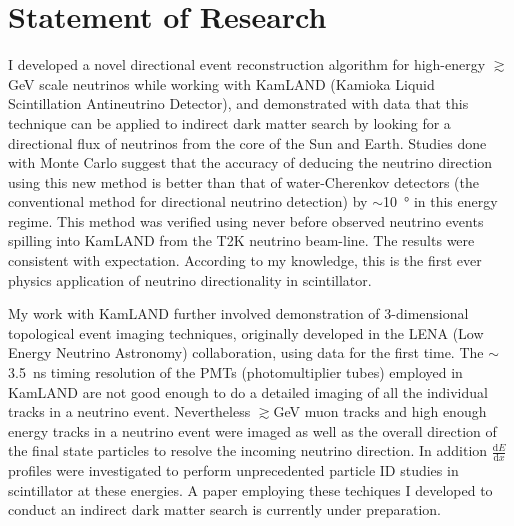 \documentclass[10pt]{article} %
\begin{document}

\clearpage
\section{Statement of Research}

I developed a novel directional event reconstruction algorithm for high-energy
$\gtrsim$\si{\giga\electronvolt} scale neutrinos while working with KamLAND
(Kamioka Liquid Scintillation Antineutrino Detector), and demonstrated with
data that this technique can be applied to indirect dark matter search by
looking for a directional flux of neutrinos from the core of the Sun and Earth.
Studies done with Monte Carlo suggest that the accuracy of deducing the
neutrino direction using this new method is better than that of water-Cherenkov
detectors (the conventional method for directional neutrino detection) by
$\sim$\SI{10}{\degree} in this energy regime. This method was verified using
never before observed neutrino events spilling into KamLAND from the T2K
neutrino beam-line. The results were consistent with expectation. According to
my knowledge, this is the first ever physics application of neutrino
directionality in scintillator.

My work with KamLAND further involved demonstration of 3-dimensional
topological event imaging techniques, originally developed in the LENA (Low
Energy Neutrino Astronomy) collaboration, using data for the first time. The
$\sim$\SI{3.5}{\nano\second} timing resolution of the PMTs (photomultiplier
tubes) employed in KamLAND are not good enough to do a detailed imaging of all
the individual tracks in a neutrino event. Nevertheless
$\gtrsim$\si{\giga\electronvolt} muon tracks and high enough energy tracks in a
neutrino event were imaged as well as the overall direction of the final state
particles to resolve the incoming neutrino direction. In addition
$\frac{\mathrm{d}E}{\mathrm{d}x}$ profiles were investigated to perform
unprecedented particle ID studies in scintillator at these energies. A paper
employing these techiques I developed to conduct an indirect dark matter search
is currently under preparation.
\end{document}
